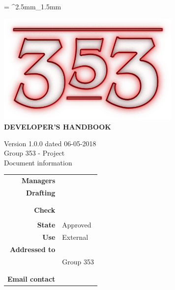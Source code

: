\documentclass[openany, a4paper, 12pt]{report}
\begin{document}
	
	\tabulinesep = ^2.5mm_1.5mm
	
	\begin{titlepage}
		\centering
		\vfill
		{
			\bfseries
			\vskip2cm
			\includegraphics[width=9cm]{../../common/images/logo.png} \\
			\vfill
			\Huge{DEVELOPER'S HANDBOOK}\\
			\vfill

			\Large Version 1.0.0 dated 06-05-2018\\ 
			\large Group 353 - Project \progetto \\
			\vfill
			\normalsize Document information\\
			\begin{table}[htbp]
				\centering
				\renewcommand\arraystretch{1.2}
				\begin{tabular}{r|l}
					\hline

					\textbf{Managers}	& \Gianluca \\
					
					\textbf{Drafting} 		& \Elena \\
											& \Parwinder\\
											& \Mirco \\
											
					\textbf{Check} 			& \Riccardo \\	
											& \Valentina \\
											
					\textbf{State} 			& Approved\\
					\textbf{Use}			& External\\
					\textbf{Addressed to}   	& \Proponente\\
										& Group 353\\
										& \Vardanega\\
										& \Cardin\\
					
					\textbf{Email contact}	& \mailgroup
				\end{tabular}
			\end{table}
			\vfill
		}    
	\end{titlepage}
	
	\renewcommand{\contentsname}{Index}
	\tableofcontents
	\renewcommand{\listfigurename}{List of Figures}
	\listoffigures
	\newpage
	
	
	
	
	
	
	
	
	
	
\end{document}
